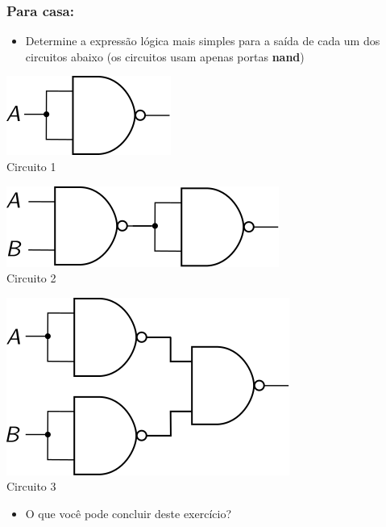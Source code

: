 \documentclass{beamer}
\begin{document}
\begin{frame}
\frametitle{Para casa:}

\begin{itemize}
\item Determine a expressão lógica mais simples para a saída de cada um dos
circuitos abaixo (os circuitos usam apenas portas \textbf{nand})
\end{itemize}
\begin{center}
\begin{minipage}{0.2\textwidth}
\includegraphics[scale=0.9]{images/nand_univ1}\\
Circuito 1
\end{minipage}
\hspace{8ex}
\begin{minipage}{0.4\textwidth}
\includegraphics[scale=0.9]{images/nand_univ2}\\
Circuito 2
\end{minipage}

\vspace{12pt}

\includegraphics[scale=0.9]{images/nand_univ3}\\
Circuito 3
\end{center}
\begin{itemize}
\item O que você pode concluir deste exercício?
\end{itemize}
 
\end{frame}
\end{document}
